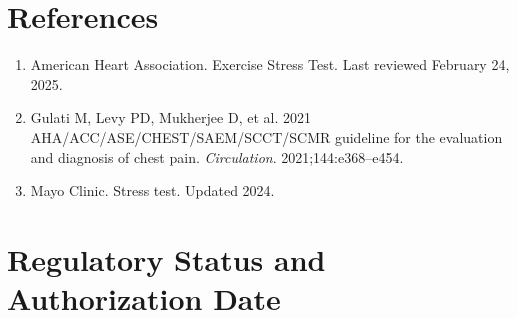 \section*{References}
\begin{enumerate}
  \item American Heart Association. Exercise Stress Test. Last reviewed February 24, 2025.
  \item Gulati M, Levy PD, Mukherjee D, et al. 2021 AHA/ACC/ASE/CHEST/SAEM/SCCT/SCMR guideline for the evaluation and diagnosis of chest pain. \textit{Circulation}. 2021;144:e368--e454.
  \item Mayo Clinic. Stress test. Updated 2024.
\end{enumerate}

\clearpage
\section*{Regulatory Status and Authorization Date}

\clearpage
